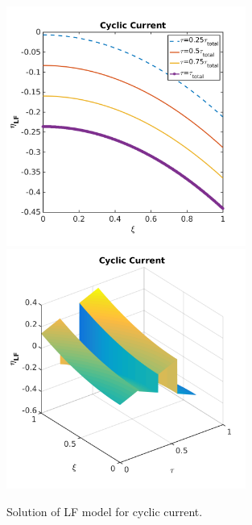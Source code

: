 \documentclass[]{article}
\begin{document}
\begin{figure}[h]
    \centering
    \includegraphics[trim = 0in 0in 0in 0in, clip, width=0.7\textwidth]{figures/etaLF2d_cycl.png}
    \\
    \includegraphics[trim = 0in 0in 0in 0in, clip, width=0.7\textwidth]{figures/etaLF3d_cycl.png}      
    \caption{Solution of LF model for cyclic current.}
    \label{fig:etaLF_cycl}
\end{figure}
\end{document}
